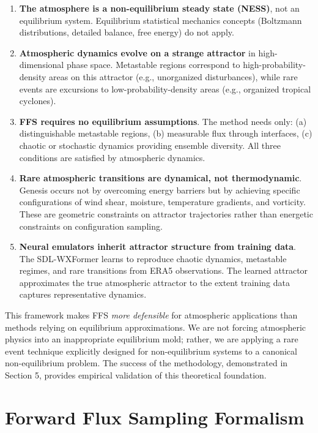 \documentclass[11pt]{article}
\begin{document}
\begin{enumerate}
    \item \textbf{The atmosphere is a non-equilibrium steady state (NESS)}, not an equilibrium system. Equilibrium statistical mechanics concepts (Boltzmann distributions, detailed balance, free energy) do not apply.
    
    \item \textbf{Atmospheric dynamics evolve on a strange attractor} in high-dimensional phase space. Metastable regions correspond to high-probability-density areas on this attractor (e.g., unorganized disturbances), while rare events are excursions to low-probability-density areas (e.g., organized tropical cyclones).
    
    \item \textbf{FFS requires no equilibrium assumptions}. The method needs only: (a) distinguishable metastable regions, (b) measurable flux through interfaces, (c) chaotic or stochastic dynamics providing ensemble diversity. All three conditions are satisfied by atmospheric dynamics.
    
    \item \textbf{Rare atmospheric transitions are dynamical, not thermodynamic}. Genesis occurs not by overcoming energy barriers but by achieving specific configurations of wind shear, moisture, temperature gradients, and vorticity. These are geometric constraints on attractor trajectories rather than energetic constraints on configuration sampling.
    
    \item \textbf{Neural emulators inherit attractor structure from training data}. The SDL-WXFormer learns to reproduce chaotic dynamics, metastable regimes, and rare transitions from ERA5 observations. The learned attractor approximates the true atmospheric attractor to the extent training data captures representative dynamics.
\end{enumerate}

This framework makes FFS \textit{more defensible} for atmospheric applications than methods relying on equilibrium approximations. We are not forcing atmospheric physics into an inappropriate equilibrium mold; rather, we are applying a rare event technique explicitly designed for non-equilibrium systems to a canonical non-equilibrium problem. The success of the methodology, demonstrated in Section 5, provides empirical validation of this theoretical foundation.
\section{Forward Flux Sampling Formalism}
\end{document}
